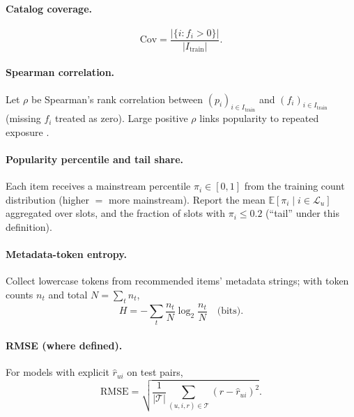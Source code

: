 \documentclass[11pt,a4paper,twoside,openright]{report}
\begin{document}
\paragraph{Catalog coverage.}
\begin{equation}
  \mathrm{Cov} = \frac{\bigl|\{ i : f_i > 0 \}\bigr|}{|I_{\text{train}}|}.
\end{equation}

\paragraph{Spearman correlation.}
Let $\rho$ be Spearman's rank correlation between $(p_i)_{i \in I_{\text{train}}}$ and $(f_i)_{i \in I_{\text{train}}}$ (missing $f_i$ treated as zero). Large positive $\rho$ links popularity to repeated exposure \citep{abdollahpouri2019managing}.

\paragraph{Popularity percentile and tail share.}
Each item receives a mainstream percentile $\pi_i \in [0,1]$ from the training count distribution (higher $=$ more mainstream). Report the mean $\mathbb{E}[\pi_i \mid i \in \mathcal{L}_u]$ aggregated over slots, and the fraction of slots with $\pi_i \le 0.2$ (``tail'' under this definition).

\paragraph{Metadata-token entropy.}
Collect lowercase tokens from recommended items' metadata strings; with token counts $n_t$ and total $N=\sum_t n_t$,
\begin{equation}
  H = - \sum_{t} \frac{n_t}{N} \log_2 \frac{n_t}{N} \quad \text{(bits)} .
\end{equation}

\paragraph{RMSE (where defined).}
For models with explicit $\hat{r}_{ui}$ on test pairs,
\begin{equation}
  \mathrm{RMSE} = \sqrt{\frac{1}{|\mathcal{T}|} \sum_{(u,i,r) \in \mathcal{T}} (r - \hat{r}_{ui})^2 } .
\end{equation}
\end{document}

